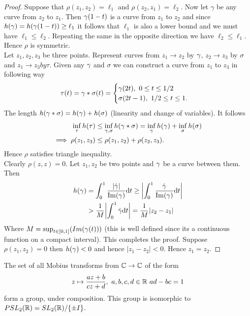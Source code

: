 \begin{proof}
  Suppose that $\rho(z_1,z_2) = \ell_1$ and $\rho(z_2,z_1) = \ell_2$. Now let $\gamma$ be any curve from $z_2$ to $z_1$. Then $\gamma(1-t)$ is a curve from $z_1$ to $z_2$ and since $h(\gamma) = h(\gamma(1-t))\geq \ell_1$ it follows that $\ell_1$ is also a lower bound and we must have $\ell_1 \leq \ell_2$. Repeating the same in the opposite direction we have $\ell_2\leq \ell_1$. Hence $\rho$ is symmetric.\\

  Let $z_1,z_2, z_3$ be three points. Represent curves from $z_1 \to z_2$ by $\gamma$, $z_2\to z_3$ by $\sigma$ and $z_1\to z_3 by \tau$. Given any $\gamma$ and $\sigma$ we can construct a curve from $z_1$ to $z_3$ in following way
  \begin{align*}
    \tau(t) = \gamma * \sigma(t) = \begin{cases}
      \gamma(2t),\ 0\leq t\leq 1/2\\
      \sigma(2t-1),\ 1/2 \leq t\leq 1.
    \end{cases}
  \end{align*}
  The length $h(\gamma*\sigma) = h(\gamma) + h(\sigma)$ (linearity and change of variables). It follows
  \begin{align*}
    \inf_\tau h(\tau) &\leq \inf_{\gamma, \sigma} h(\gamma*\sigma) = \inf_\gamma h(\gamma) + \inf_\sigma h(\sigma)\\
    \implies \rho(z_1,z_3) &\leq \rho(z_1,z_2) + \rho(z_2,z_3).
  \end{align*}
  Hence $\rho$ satisfies triangle inequality.\\

  Clearly $\rho(z,z) = 0$. Let $z_1, z_2$ be two points and $\gamma$ be a curve between them. Then
  \begin{align}
    h(\gamma) &= \int_0^1 \frac{|\dot{\gamma}|}{\Im(\gamma)} \dd t \geq \abs{\int^1_0 \frac{\dot{\gamma}}{\Im(\gamma)} \dd t} \nonumber\\
          &> \frac{1}{M}\abs{\int^1_0 \dot{\gamma}\dd t} = \frac{1}{M} |z_2-z_1|
  \end{align}
  Where $M = \sup_{t\in [0,1]}(Im(\gamma(t)))$ (this is well defined since its a continuous function on a compact interval). This completes the proof.
  Suppose $\rho(z_1,z_2) = 0$ then $h(\gamma)< 0$ and hence $|z_1 - z_2| < 0$. Hence $z_1 = z_2$.
\end{proof}
\begin{proposition}
  The set of all Mobius transforms from $\mathbb{C}\to \mathbb{C}$ of the form
  \begin{align*}
    z \mapsto \frac{az+b}{cz+d},\ a,b,c,d\in \mathbb{R}\ ad-bc =1
  \end{align*}
  form a group, under composition. This group is isomorphic to $PSL_2(\mathbb{R}) = SL_2(\mathbb{R})/\{\pm I\}$.
\end{proposition}
